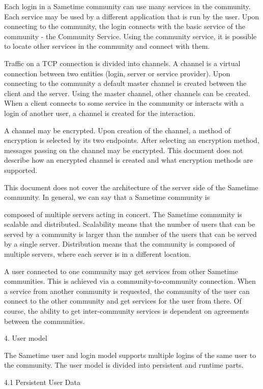 \documentclass[titlepage,oneside]{book}
\begin{document}
Each login in a Sametime community can use many services in the
community. Each service may be used by a different application that is
run by the user. Upon connecting to the community, the login connects
with the basic service of the community - the Community Service. Using
the community service, it is possible to locate other services in
the community and connect with them.

Traffic on a TCP connection is divided into channels. A channel is a
virtual connection between two entities (login, server or service
provider). Upon connecting to the community a default master channel is
created between the client and the server. Using the master channel,
other channels can be created. When a client connects to some service
in the community or interacts with a login of another user, a channel
is created for the interaction.

A channel may be encrypted. Upon creation of the channel,
a method of
encryption is selected by its two endpoints. After selecting an
encryption method, messages passing on the channel may be encrypted.
This document does not describe how an encrypted channel is created and
what encryption methods are supported.

This document does not cover the architecture of the server side of the
Sametime community. In general, we can say that a Sametime community is

composed of multiple servers acting in concert. The Sametime community
is scalable and distributed. Scalability means that the number of users
that can be served by a community is larger than the number of the
users that can be served by a single server. Distribution means that
the community is composed of multiple servers, where each server is in
a different location.

A user connected to one community may get services from other Sametime
communities. This is achieved via a community-to-community connection.
When a service from another community is requested, the community of
the user can connect to the other community and get services for the
user from there. Of course, the ability to get inter-community services
is dependent on agreements between the communities.

4. User model

The Sametime user and login model supports multiple logins of the same
user to the community. The user model is divided into persistent and
runtime parts.

4.1 Persistent User Data
\end{document}
